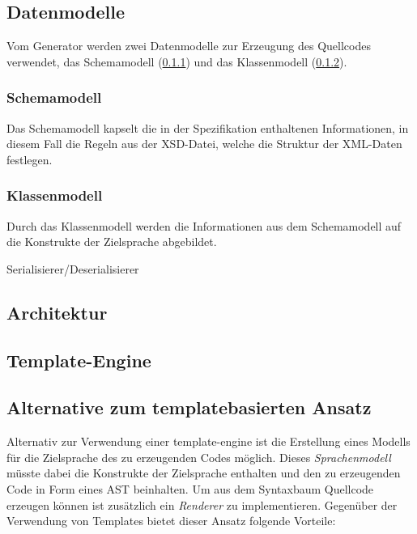 \documentclass[a4paper]{scrartcl}
\begin{document}
    \subsection{Datenmodelle}

    Vom Generator werden zwei Datenmodelle zur Erzeugung des Quellcodes verwendet, das Schemamodell (\cref{sec:schemamodel}) und das Klassenmodell (\cref{sec:classmodel}).

    \subsubsection{Schemamodell}
    \label{sec:schemamodel}

    Das Schemamodell kapselt die in der Spezifikation enthaltenen Informationen, in diesem Fall die Regeln aus der \gls{XSD}-Datei, welche die Struktur der XML-Daten festlegen.

    \subsubsection{Klassenmodell}
    \label{sec:classmodel}

    Durch das Klassenmodell werden die Informationen aus dem Schemamodell auf die Konstrukte der Zielsprache abgebildet.

    Serialisierer/Deserialisierer

    \subsection{Architektur}

    \subsection{Template-Engine}

    \subsection{Alternative zum templatebasierten Ansatz}

    Alternativ zur Verwendung einer \gls{template-engine} ist die Erstellung eines Modells für die Zielsprache des zu erzeugenden Codes möglich. Dieses \emph{Sprachenmodell} müsste dabei die Konstrukte der Zielsprache enthalten und den zu erzeugenden Code in Form eines \gls{AST} beinhalten.
    Um aus dem Syntaxbaum Quellcode erzeugen können ist zusätzlich ein \emph{Renderer} zu implementieren. Gegenüber der Verwendung von Templates bietet dieser Ansatz folgende Vorteile:
\end{document}
